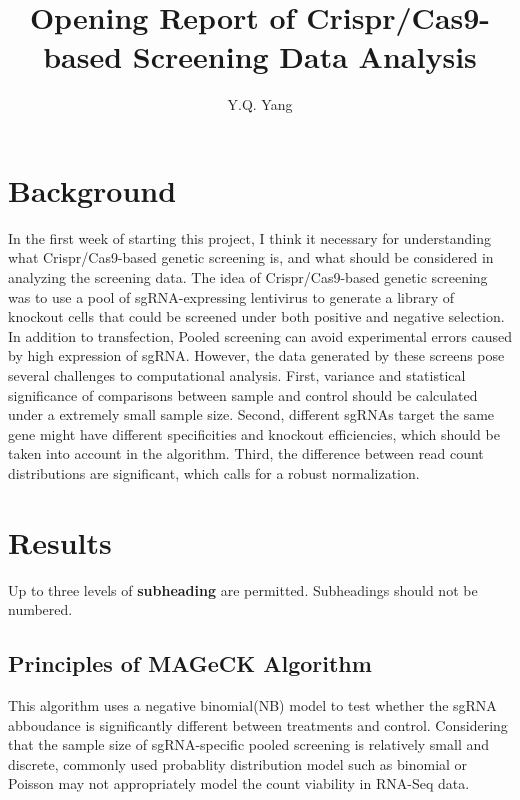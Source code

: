 \documentclass[fleqn,10pt]{wlscirep}
\title{Opening Report of Crispr/Cas9-based Screening Data Analysis}
\author[1]{Y.Q. Yang}
\begin{document}
\flushbottom
\maketitle
%
%
\thispagestyle{empty}


\section*{Background}

In the first week of starting this project, I think it necessary for understanding what Crispr/Cas9-based genetic screening is, and what should be considered in analyzing the screening data.  The idea of Crispr/Cas9-based genetic screening was to use a pool of sgRNA-expressing lentivirus to generate a library of knockout cells that could be screened under both positive and negative selection. \cite{wang2014genetic} In addition to transfection, Pooled screening can avoid experimental errors caused by high expression of sgRNA.
However, the data generated by these screens pose several challenges to computational analysis. First, variance and statistical significance of comparisons between sample and control should be calculated under a extremely small sample size.  Second, different sgRNAs target the same gene might have different specificities and knockout efficiencies, which should be taken into account in the algorithm.  Third, the difference between read count distributions are significant, which calls for a robust normalization. \cite{li2014mageck}

\section*{Results}

Up to three levels of \textbf{subheading} are permitted. Subheadings should not be numbered.

\subsection*{Principles of MAGeCK Algorithm}

This algorithm uses a negative binomial(NB) model to test whether the sgRNA abboudance is significantly different between treatments and control.  Considering that the sample size of sgRNA-specific pooled screening is relatively small and discrete, commonly used probablity distribution model such as binomial or Poisson may not appropriately model the count viability in RNA-Seq data.\cite{di2011nbp}
\end{document}
